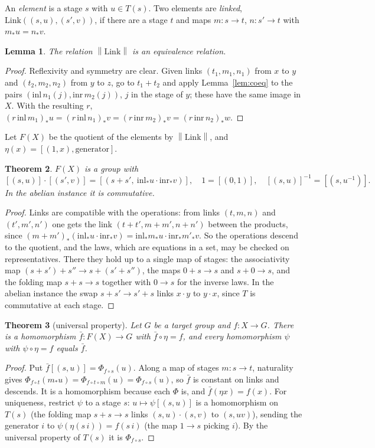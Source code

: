 \documentclass[11pt]{amsart}
\newtheorem{theorem}{Theorem}[section]
\newtheorem{lemma}[theorem]{Lemma}
\theoremstyle{definition}
\theoremstyle{remark}
\newcommand{\mere}[1]{\left\lVert #1\right\rVert}
\newcommand{\Link}{\mathrm{Link}}
\begin{document}
An \emph{element} is a stage $s$ with $u\in T(s)$. Two elements are
\emph{linked}, $\Link((s,u),(s',v))$, if there are a stage $t$ and maps
$m:s\to t$, $n:s'\to t$ with $m_*u=n_*v$.

\begin{lemma}
The relation $\mere{\Link}$ is an equivalence relation.
\end{lemma}
\begin{proof}
Reflexivity and symmetry are clear. Given links $(t_1,m_1,n_1)$ from $x$
to $y$ and $(t_2,m_2,n_2)$ from $y$ to $z$, go to $t_1+t_2$ and apply
Lemma~\ref{lem:coeq} to the pairs $(\mathrm{inl}\,n_1(j),\mathrm{inr}\,m_2(j))$,
$j$ in the stage of $y$; these have the same image in $X$. With the
resulting $r$, $(r\,\mathrm{inl}\,m_1)_*u=(r\,\mathrm{inl}\,n_1)_*v
=(r\,\mathrm{inr}\,m_2)_*v=(r\,\mathrm{inr}\,n_2)_*w$.
\end{proof}

Let $F(X)$ be the quotient of the elements by $\mere{\Link}$, and
$\eta(x)=[(1,x),\text{generator}]$.

\begin{theorem}\label{thm:group}
$F(X)$ is a group with
\[
[(s,u)]\cdot[(s',v)]=[(s+s',\ \mathrm{inl}_*u\cdot\mathrm{inr}_*v)],\quad
1=[(0,1)],\quad [(s,u)]^{-1}=[(s,u^{-1})].
\]
In the abelian instance it is commutative.
\end{theorem}
\begin{proof}
Links are compatible with the operations: from links $(t,m,n)$ and
$(t',m',n')$ one gets the link $(t+t',m+m',n+n')$ between the products,
since $(m+m')_*(\mathrm{inl}_*u\cdot\mathrm{inr}_*v)=\mathrm{inl}_*m_*u\cdot
\mathrm{inr}_*m'_*v$. So the operations descend to the quotient, and the
laws, which are equations in a set, may be checked on representatives.
There they hold up to a single map of stages: the associativity map
$(s+s')+s''\to s+(s'+s'')$, the maps $0+s\to s$ and $s+0\to s$, and the
folding map $s+s\to s$ together with $0\to s$ for the inverse laws. In
the abelian instance the swap $s+s'\to s'+s$ links $x\cdot y$ to
$y\cdot x$, since $T$ is commutative at each stage.
\end{proof}

\begin{theorem}[universal property]\label{thm:up}
Let $G$ be a target group and $f:X\to G$. There is a homomorphism
$\bar f:F(X)\to G$ with $\bar f\circ\eta=f$, and every homomorphism $\psi$
with $\psi\circ\eta=f$ equals $\bar f$.
\end{theorem}
\begin{proof}
Put $\bar f[(s,u)]=\Phi_{f\circ s}(u)$. Along a map of stages
$m:s\to t$, naturality gives $\Phi_{f\circ t}(m_*u)=\Phi_{f\circ t\circ m}(u)
=\Phi_{f\circ s}(u)$, so $\bar f$ is constant on links and descends. It is
a homomorphism because each $\Phi$ is, and $\bar f(\eta x)=f(x)$. For
uniqueness, restrict $\psi$ to a stage $s$: $u\mapsto\psi[(s,u)]$ is a
homomorphism on $T(s)$ (the folding map $s+s\to s$ links
$(s,u)\cdot(s,v)$ to $(s,uv)$), sending the generator $i$ to
$\psi(\eta(s\,i))=f(s\,i)$ (the map $1\to s$ picking $i$). By the
universal property of $T(s)$ it is $\Phi_{f\circ s}$.
\end{proof}
\end{document}
